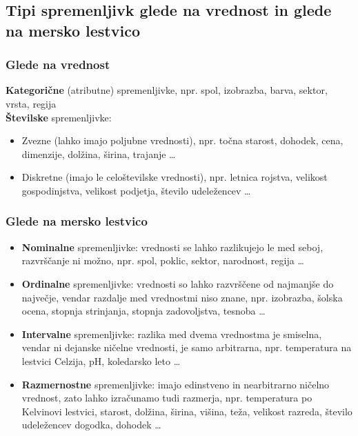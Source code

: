 \subsection*{Tipi spremenljivk glede na vrednost in glede na mersko lestvico}

\subsubsection*{Glede na vrednost}

\textbf{Kategorične} (atributne) spremenljivke, npr. spol, izobrazba, barva, sektor, vrsta, regija\\
\textbf{Številske} spremenljivke:
\begin{itemize}
\item Zvezne (lahko imajo poljubne vrednosti), npr. točna starost, dohodek, cena, dimenzije, dolžina, širina, trajanje …
\item Diskretne (imajo le celoštevilske vrednosti), npr. letnica rojstva, velikost gospodinjstva, velikost podjetja, število udeležencev …
\end{itemize}

\subsubsection*{Glede na mersko lestvico}
\begin{itemize}
\item \textbf{Nominalne} spremenljivke: vrednosti se lahko razlikujejo le med seboj, razvrščanje ni možno, npr. spol, poklic, sektor, narodnost, regija …
\item \textbf{Ordinalne} spremenljivke: vrednosti so lahko razvrščene od najmanjše do največje, vendar razdalje med vrednostmi niso znane, npr. izobrazba, šolska ocena, stopnja strinjanja, stopnja zadovoljstva, tesnoba …
\item \textbf{Intervalne} spremenljivke: razlika med dvema vrednostma je smiselna, vendar ni dejanske ničelne vrednosti, je samo arbitrarna, npr. temperatura na lestvici Celzija, pH, koledarsko leto …
\item \textbf{Razmernostne} spremenljivke: imajo edinstveno in nearbitrarno ničelno vrednost, zato lahko izračunamo tudi razmerja, npr. temperatura po Kelvinovi lestvici, starost, dolžina, širina, višina, teža, velikost razreda, število udeležencev dogodka, dohodek …
\end{itemize}

